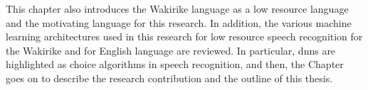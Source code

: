 This chapter also introduces the Wakirike language as a low resource language and the motivating language for this research.  In addition, the various machine learning architectures used in this research for low resource speech recognition for the Wakirike and for English language are reviewed. In particular, \acrfull{dnns} are highlighted as choice algorithms in speech recognition, and then, the Chapter goes on to describe the research contribution and the outline of this thesis.


